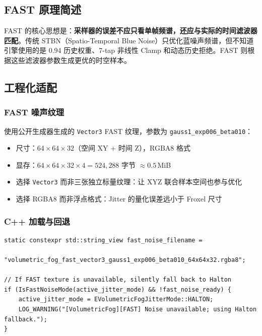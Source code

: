 \documentclass[11pt,a4paper]{article}
\begin{document}
\subsection{FAST 原理简述}

FAST 的核心思想是：\textbf{采样器的误差不应只看单帧频谱，还应与实际的时间滤波器匹配}。传统 STBN（Spatio-Temporal Blue Noise）只优化蓝噪声频谱，但不知道引擎使用的是 0.94 历史权重、7-tap 非线性 Clamp 和动态历史拒绝。FAST 则根据这些滤波器参数生成更优的时空样本。

\subsection{工程化适配}

\subsubsection{FAST 噪声纹理}

使用公开生成器生成的 \texttt{Vector3} FAST 纹理，参数为 \texttt{gauss1\_exp006\_beta010}：

\begin{itemize}
    \item 尺寸：$64\times64\times32$（空间 XY + 时间 Z），RGBA8 格式
    \item 显存：$64\times64\times32\times4 = 524{,}288$ 字节 $\approx 0.5$\,MiB
    \item 选择 \texttt{Vector3} 而非三张独立标量纹理：让 XYZ 联合样本空间也参与优化
    \item 选择 RGBA8 而非浮点格式：Jitter 的量化误差远小于 Froxel 尺寸
\end{itemize}

\subsubsection{C++ 加载与回退}

\begin{lstlisting}[language=cppinline, caption={VolumetricFogPass.cpp 中的 FAST 纹理加载}]
static constexpr std::string_view fast_noise_filename =
    "volumetric_fog_fast_vector3_gauss1_exp006_beta010_64x64x32.rgba8";

// If FAST texture is unavailable, silently fall back to Halton
if (IsFastNoiseMode(active_jitter_mode) && !fast_noise_ready) {
    active_jitter_mode = EVolumetricFogJitterMode::HALTON;
    LOG_WARNING("[VolumetricFog][FAST] Noise unavailable; using Halton fallback.");
}
\end{lstlisting}
\end{document}
